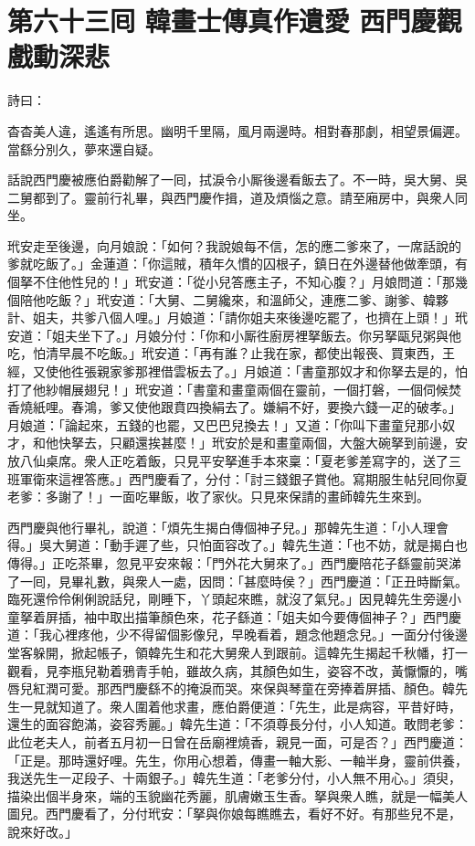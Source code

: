 
\chapter*{第六十三囘 韓畫士傳真作遺愛 西門慶觀戲動深悲}


詩曰：

杳杳美人違，遙遙有所思。幽明千里隔，風月兩邊時。相對春那劇，相望景偏遲。當繇分別久，夢來還自疑。

話說西門慶被應伯爵勸解了一囘，拭淚令小厮後邊看飯去了。不一時，吳大舅、吳二舅都到了。靈前行礼畢，與西門慶作揖，道及煩惱之意。請至廂房中，與衆人同坐。

玳安走至後邊，向月娘說：「如何？我說娘每不信，怎的應二爹來了，一席話說的爹就吃飯了。」金蓮道：「你這賊，積年久慣的囚根子，鎮日在外邊替他做牽頭，有個拏不住他性兒的！」玳安道：「從小兒答應主子，不知心腹？」月娘問道：「那幾個陪他吃飯？」玳安道：「大舅、二舅纔來，和溫師父，連應二爹、謝爹、韓夥計、姐夫，共爹八個人哩。」月娘道：「請你姐夫來後邊吃罷了，也擠在上頭！」玳安道：「姐夫坐下了。」月娘分付：「你和小厮徃廚房裡拏飯去。你另拏甌兒粥與他吃，怕清早晨不吃飯。」玳安道：「再有誰？止我在家，都使出報䘮、買東西，王經，又使他徃張親家爹那裡借雲板去了。」月娘道：「書童那奴才和你拏去是的，怕打了他紗帽展翅兒！」玳安道：「書童和畫童兩個在靈前，一個打磐，一個伺候焚香燒紙哩。春鴻，爹又使他跟賁四換絹去了。嫌絹不好，要換六錢一疋的破孝。」月娘道：「論起來，五錢的也罷，又巴巴兒換去！」又道：「你叫下畫童兒那小奴才，和他快拏去，只顧還挨甚麼！」玳安於是和畫童兩個，大盤大碗拏到前邊，安放八仙桌席。衆人正吃着飯，只見平安拏進手本來稟：「夏老爹差寫字的，送了三班軍衛來這裡答應。」西門慶看了，分付：「討三錢銀子賞他。寫期服生帖兒囘你夏老爹：多謝了！」一面吃畢飯，收了家伙。只見來保請的畫師韓先生來到。

西門慶與他行畢礼，說道：「煩先生揭白傳個神子兒。」那韓先生道：「小人理會得。」吳大舅道：「動手遲了些，只怕面容改了。」韓先生道：「也不妨，就是揭白也傳得。」正吃茶畢，忽見平安來報：「門外花大舅來了。」西門慶陪花子繇靈前哭涕了一囘，見畢礼數，與衆人一處，因問：「甚麼時侯？」西門慶道：「正丑時斷氣。臨死還伶伶俐俐說話兒，剛睡下，丫頭起來瞧，就沒了氣兒。」因見韓先生旁邊小童拏着屏插，袖中取出描筆顏色來，花子繇道：「姐夫如今要傳個神子？」西門慶道：「我心裡疼他，少不得留個影像兒，早晚看着，題念他題念兒。」一面分付後邊堂客躲開，掀起帳子，領韓先生和花大舅衆人到跟前。這韓先生揭起千秋幡，打一觀看，見李瓶兒勒着鴉青手帕，雖故久病，其顏色如生，姿容不改，黃懨懨的，嘴唇兒紅潤可愛。那西門慶繇不的掩淚而哭。來保與琴童在旁捧着屏插、顏色。韓先生一見就知道了。衆人圍着他求畫，應伯爵便道：「先生，此是病容，平昔好時，還生的面容飽滿，姿容秀麗。」{}韓先生道：「不須尊長分付，小人知道。敢問老爹：此位老夫人，前者五月初一日曾在岳廟裡燒香，親見一面，可是否？」{}西門慶道：「正是。那時還好哩。先生，你用心想着，傳畫一軸大影、一軸半身，靈前供養，我送先生一疋段子、十兩銀子。」韓先生道：「老爹分付，小人無不用心。」須臾，描染出個半身來，端的玉貌幽花秀麗，肌膚嫩玉生香。拏與衆人瞧，就是一幅美人圖兒。西門慶看了，分付玳安：「拏與你娘每瞧瞧去，看好不好。有那些兒不是，說來好改。」

